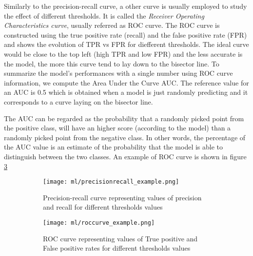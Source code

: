 \documentclass[11pt]{report}
\begin{document}
Similarly to the precision-recall curve, a other curve is usually employed to study the effect of different thresholds. It is called the \emph{Receiver Operating Characteristics curve}, usually referred as ROC curve.
The ROC curve is constructed using the true positive rate (recall) and the false positive rate (FPR) and shows the evolution of TPR vs FPR for diefferent thresholds.
The ideal curve would be close to the top left (high TPR and low FPR) and the less accurate is the model, the more this curve tend to lay down to the bisector line.
To summarize the model's performances with a single number using ROC curve information, we compute the Area Under the Curve AUC.
The reference value for an AUC is 0.5 which is obtained when a model is just randomly predicting and it corresponds to a curve laying on the bisector line.

The AUC can be regarded as the probability that a randomly picked point from the positive class, will have an higher score (according to the model) than a randomly picked point from the negative class.
In other words, the percentage of the AUC value is an estimate of the probability that the model is able to distinguish between the two classes.
An example of ROC curve is shown in figure \ref{fig:roccurve}


\begin{figure}
\centering
\begin{subfigure}[t]{0.4\textwidth}
\texttt{[image: ml/precisionrecall\_example.png]}
\caption{Precision-recall curve representing values of precision and recall for different thresholds values}
\label{fig:precisionrecall}
\end{subfigure}
\begin{subfigure}[t]{0.43\textwidth}
\texttt{[image: ml/roccurve\_example.png]}
\caption{ROC curve representing values of True positive and False positive rates for different thresholds values}
\label{fig:roccurve}
\end{subfigure}
\caption{}
 
\end{figure}
\end{document}
